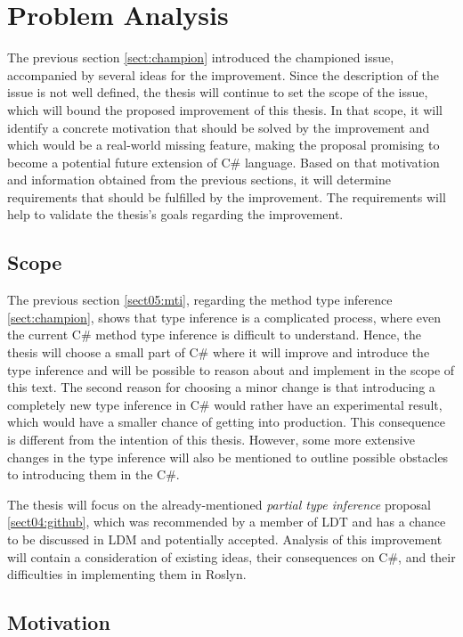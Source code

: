 \chapter{Problem Analysis}

The previous section \ref{sect:champion} introduced the championed issue, accompanied by several ideas for the improvement.
Since the description of the issue is not well defined, the thesis will continue to set the scope of the issue, which will bound the proposed improvement of this thesis. 
In that scope, it will identify a concrete motivation that should be solved by the improvement and which would be a real-world missing feature, making the proposal promising to become a potential future extension of C\# language. 
Based on that motivation and information obtained from the previous sections, it will determine requirements that should be fulfilled by the improvement. 
The requirements will help to validate the thesis’s goals regarding the improvement.

\section{Scope}

The previous section \ref{sect05:mti}, regarding the method type inference \ref{sect:champion}, shows that type inference is a complicated process, where even the current C\# method type inference is difficult to understand. 
Hence, the thesis will choose a small part of C\# where it will improve and introduce the type inference and will be possible to reason about and implement in the scope of this text. 
The second reason for choosing a minor change is that introducing a completely new type inference in C\# would rather have an experimental result, which would have a smaller chance of getting into production. 
This consequence is different from the intention of this thesis. 
However, some more extensive changes in the type inference will also be mentioned to outline possible obstacles to introducing them in the C\#.
\par
The thesis will focus on the already-mentioned \textit{partial type inference} proposal \ref{sect04:github}, which was recommended by a member of LDT and has a chance to be discussed in LDM and potentially accepted. 
Analysis of this improvement will contain a consideration of existing ideas, their consequences on C\#, and their difficulties in implementing them in Roslyn.

\section{Motivation} \label{sect10:mot}

